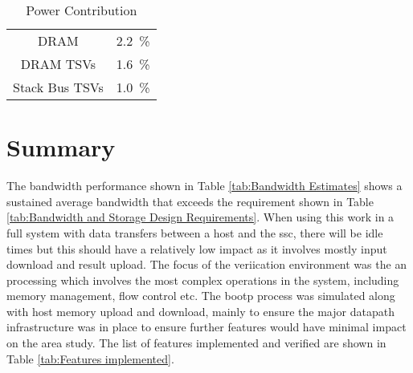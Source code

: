 \begin{table}[h]
\begin{subtable}{0.75\textwidth}
\begin{adjustbox}{width=0.55\textwidth}
\begin{tabular}{|c|c|}
                   DRAM  & \SI[per-mode=symbol]{ 2.2}{\percent}  \\
              DRAM TSVs  & \SI[per-mode=symbol]{ 1.6}{\percent}  \\
         Stack Bus TSVs  & \SI[per-mode=symbol]{ 1.0}{\percent}  \\
        \hline
      \end{tabular}
    \end{adjustbox}
    \vspace{3pt}
    \captionsetup{justification=centering, skip=10pt}
    \caption{Power Contribution}
    \label{tab:Power Dissipation}
  \end{subtable}
  \end{table}


\section{Summary}
\label{sec:Results summary}

The bandwidth performance shown in Table \ref{tab:Bandwidth Estimates} shows a sustained average bandwidth that exceeds the requirement shown in Table \ref{tab:Bandwidth and Storage Design Requirements}.
When using this work in a full system with data transfers between a host and the \ac{ssc}, there will be idle times but this should have a relatively low impact as it involves mostly input download and result upload.
The focus of the veriication environment was the \ac{an} processing which involves the most complex operations in the system, including memory management, flow control etc.
The \ac{bootp} process was simulated along with host memory upload and download, mainly to ensure the major datapath infrastructure was in place to ensure further features would have minimal impact on the area study.
The list of features implemented and verified are shown in Table \ref{tab:Features implemented}.

